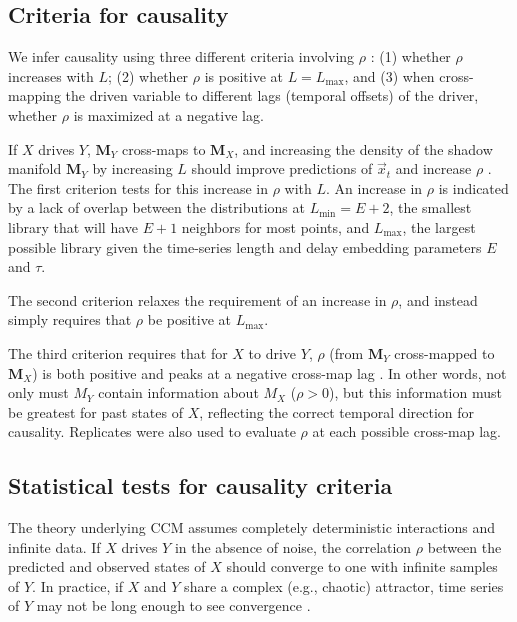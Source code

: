 \documentclass[10pt]{article}
\begin{document}
\subsection{Criteria for causality}

We infer causality using three different criteria involving $\rho$ \cite{Sugihara2012, Ye2015}: (1) whether $\rho$ increases with $L$; (2) whether $\rho$ is positive at $L = L_{\max}$, and (3) when cross-mapping the driven variable to different lags (temporal offsets) of the driver, whether $\rho$ is maximized at a negative lag.

If $X$ drives $Y$, $\pmb{M}_Y$ cross-maps to $\pmb{M}_X$, and increasing the density of the shadow manifold $\pmb{M}_Y$ by increasing $L$ should improve predictions of $\vec{x}_t$ and increase $\rho$ \cite{Sugihara2012}.
The first criterion tests for this increase in $\rho$ with $L$.
An increase in $\rho$ is indicated by a lack of overlap between the distributions at $L_{\min} = E + 2$, the smallest library that will have $E + 1$ neighbors for most points, and $L_{\max}$, the largest possible library given the time-series length and delay embedding parameters $E$ and $\tau$.


The second criterion relaxes the requirement of an increase in $\rho$, and instead simply requires that $\rho$ be positive at $L_{\max}$.

The third criterion requires that for $X$ to drive $Y$, $\rho$ (from $\pmb{M}_Y$ cross-mapped to $\pmb{M}_X$) is both positive and peaks at a negative cross-map lag \cite{Ye2015}.
In other words, not only must $M_Y$ contain information about $M_X$ ($\rho > 0$), but this information must be greatest for past states of $X$, reflecting the correct temporal direction for causality.
Replicates were also used to evaluate $\rho$ at each possible cross-map lag. 


\subsection{Statistical tests for causality criteria}

The theory underlying CCM assumes completely deterministic interactions and infinite data.
If $X$ drives $Y$ in the absence of noise, the correlation $\rho$ between the predicted and observed states of $X$ should converge to one with infinite samples of $Y$.
In practice, if $X$ and $Y$ share a complex (e.g., chaotic) attractor, time series of $Y$ may not be long enough to see convergence \cite{Sugihara2012}.
\end{document}
